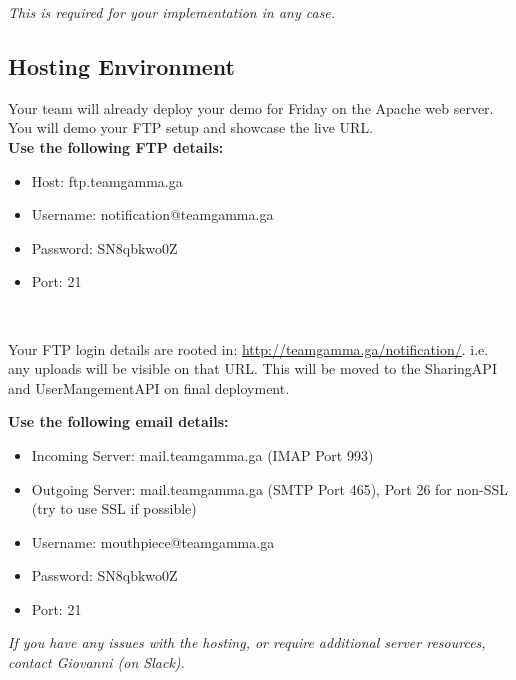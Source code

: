 \documentclass{article}
\begin{document}
\begin{center}
   \textit{This is required for your implementation in any case.}
\end{center}

\subsection{Hosting Environment}
Your team will already deploy your demo for Friday on the Apache web server. You will demo your FTP setup and showcase the live URL.\\

\textbf{Use the following FTP details:} 

\begin{itemize}
\begin{itemize}
\item Host: ftp.teamgamma.ga
\item Username: notification@teamgamma.ga
\item Password: SN8qbkwo0Z
\item Port: 21
\end{itemize}
\end{itemize}

\\
\begin{flushleft}
    Your FTP login details are rooted in: \url{http://teamgamma.ga/notification/}. i.e. any uploads will be visible on that URL. This will be moved to the SharingAPI and UserMangementAPI on final deployment.
\end{flushleft}

\textbf{Use the following email details:} 
\begin{itemize}
\begin{itemize}
\item Incoming Server: mail.teamgamma.ga (IMAP Port 993)
\item Outgoing Server: mail.teamgamma.ga (SMTP Port 465), Port 26 for non-SSL (try to use SSL if possible)
\item Username: mouthpiece@teamgamma.ga
\item Password: SN8qbkwo0Z
\item Port: 21
\end{itemize}
\end{itemize}


\begin{center}
   \textit{If you have any issues with the hosting, or require additional server resources, contact Giovanni (on Slack).}
\end{center}
\end{document}
